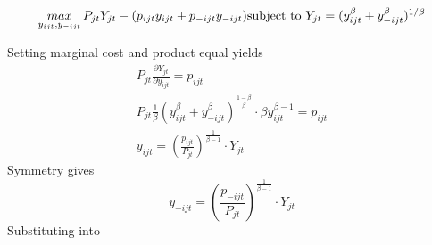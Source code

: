 \documentclass[12pt]{article} %
\begin{document}
\[\begin{equation*}
	\mathop{max}\limits_{y_{ijt},y_{-ijt}} P_{jt} Y_{jt} - (p_{ijt}y_{ijt}+p_{-ijt}y_{-ijt})\\
	\text{subject to } Y_{jt} = (y_{ijt}^\beta +y_{-ijt}^\beta)^{1/ \beta}
 \end{equation*}\]

Setting marginal cost and product equal yields
\[\begin{align}
	P_{jt} \frac{\partial Y_{jt}}{\partial y_{ijt}} = p_{ijt}\\
	P_{jt} \frac{1}{\beta} (y_{ijt}^\beta +y_{-ijt}^\beta)^\frac{1-\beta}{\beta} \cdot \beta y_{ijt}^{\beta-1}=p_{ijt}\\
	y_{ijt} = (\frac{p_{ijt}}{P_{jt}})^\frac{1}{\beta-1}\cdot Y_{jt}
\end{align}\]
Symmetry gives
\[
y_{-ijt} = (\frac{p_{-ijt}}{P_{jt}})^\frac{1}{\beta-1}\cdot Y_{jt}
\]
Substituting into 




\footnotesize

%
\end{document}
